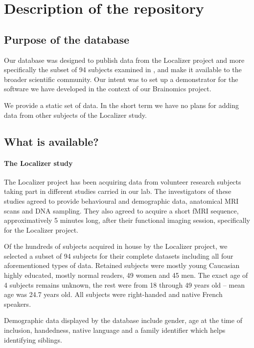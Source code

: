 \documentclass[review]{elsarticle}
\begin{document}
\section{Description of the repository}

\subsection{Purpose of the database}

Our database was designed to publish data from the Localizer project \cite{Pinel2007} and more specifically the subset of 94 subjects examined in \cite{Pinel2012}, and make it available to the broader scientific community. Our intent was to set up a demonstrator for the software we have developed in the context of our Brainomics project.

We provide a static set of data. In the short term we have no plans for adding data from other subjects of the Localizer study.


\subsection{What is available?}

\paragraph{The Localizer study} The Localizer project has been acquiring data from volunteer research subjects taking part in different studies carried in our lab. The investigators of these studies agreed to provide behavioural and demographic data, anatomical MRI scans and DNA sampling. They also agreed to acquire a short fMRI sequence, approximatively 5 minutes long, after their functional imaging session, specifically for the Localizer project.

Of the hundreds of subjects acquired in house by the Localizer project, we selected a subset of 94 subjects for their complete datasets \cite{Pinel2012} including all four aforementioned types of data. Retained subjects were mostly young Caucasian highly educated, mostly normal readers, 49 women and 45 men. The exact age of 4 subjects remains unknown, the rest were from 18 through 49 years old -- mean age was 24.7 years old. All subjects were right-handed and native French speakers.

Demographic data displayed by the database include gender, age at the time of inclusion, handedness, native language and a family identifier which helps identifying siblings.
\end{document}
